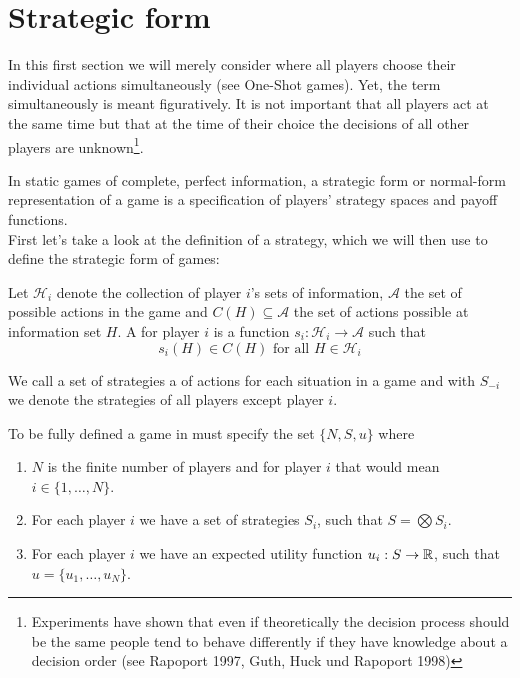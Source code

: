 
\section{Strategic form}

In this first section we will merely consider  where all players choose their individual actions simultaneously (see One-Shot games). Yet, the term simultaneously is meant figuratively. It is not important that all players act at the same time but that at the time of their choice the decisions of all other players are unknown\footnote{Experiments have shown that even if theoretically the decision process should be the same people tend to behave differently if they have knowledge about a decision order  (see Rapoport 1997, Guth, Huck und Rapoport 1998)}.

In static games of complete, perfect information, a strategic form or normal-form representation of a game is a specification of players' strategy spaces and payoff functions. \\

First let's take a look at the definition of a strategy, which we will then use to define the strategic form of games: 

\begin{definition}[Strategy]
	Let $\mathcal{H}_{i}$ denote the collection of player $i$'s sets of information, $\mathcal{A}$ the set of possible actions in the game and $C(H) \subseteq \mathcal{A}$ the set of actions possible at information set $H$. A  for player $i$ is a function $s_{i} \colon \mathcal{H}_{i} \rightarrow \mathcal{A}$ such that
	\[ s_{i}(H) \in C(H) \text{ for all } H \in \mathcal{H}_{i} \]
\end{definition}

We call a set of strategies a  of actions for each situation in a game and with $S_{-i}$ we denote the strategies of all players except player $i$.\\

\begin{definition}
To be fully defined a game in  must specify the set $\{ N, S, u \}$ where
	\begin{enumerate}
		\item $N$ is the finite number of players and for player $i$ that would mean $i \in \{ 1, \dotsc, N \}$.
		\item For each player $i$ we have a set of strategies $S_{i}$, such that $S = \bigotimes S_{i}$.
		\item For each player $i$ we have an expected utility function $u_{i} : S \rightarrow \mathbb{R}$, such that $u = \{ u_{1}, \dotsc, u_{N} \}$.
	\end{enumerate}
\end{definition}



